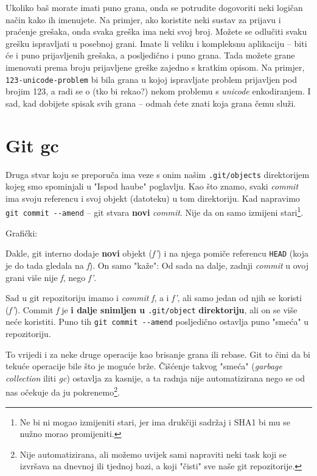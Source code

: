 Ukoliko baš morate imati puno grana, onda se potrudite dogovoriti neki logičan način kako ih imenujete.
Na primjer, ako koristite neki sustav za prijavu i praćenje grešaka, onda svaka greška ima neki svoj broj.
Možete se odlučiti svaku grešku ispravljati u posebnoj grani. 
Imate li veliku i kompleksnu aplikaciju -- biti će i puno prijavljenih grešaka, a posljedično i puno grana.
Tada možete grane imenovati prema broju prijavljene greške zajedno s kratkim opisom.
Na primjer, \verb+123-unicode-problem+ bi bila grana u kojoj ispravljate problem prijavljen pod brojim 123, a radi se o (tko bi rekao?) nekom problemu s \emph{unicode} enkodiranjem.
I sad, kad dobijete spisak svih grana -- odmah ćete znati koja grana čemu služi.

\section*{Git gc}

Druga stvar koju se preporuča ima veze s onim našim \verb+.git/objects+ direktorijem kojeg smo spominjali u "Ispod haube" poglavlju.
Kao što znamo, svaki \emph{commit} ima svoju referencu i svoj objekt (datoteku) u tom direktoriju.
Kad napravimo \verb+git commit --amend+ -- git stvara \textbf{novi} \emph{commit}.
Nije da on samo izmijeni stari\footnote{Ne bi ni mogao izmijeniti stari, jer ima drukčiji sadržaj i SHA1 bi mu se nužno morao promijeniti.}.

Grafički:



Dakle, git interno dodaje \textbf{novi} objekt (\emph{f'}) i na njega pomiče referencu \verb+HEAD+ (koja je do tada gledala na \emph f).
On samo "kaže": Od sada na dalje, zadnji \emph{commit} u ovoj grani više nije \emph f, nego \emph{f'}.

Sad u git repozitoriju imamo i \emph{commit} \emph f, a i \emph{f'}, ali samo jedan od njih se koristi (\emph{f'}).
Commit \emph f je \textbf{i dalje snimljen u} \verb+.git/object+ \textbf{direktoriju}, ali on se više neće koristiti.
Puno tih \verb+git commit --amend+ posljedično ostavlja puno "smeća" u repozitoriju.

To vrijedi i za neke druge operacije kao brisanje grana ili rebase.
Git to čini da bi tekuće operacije bile što je moguće brže.
Čišćenje takvog "smeća" (\emph{garbage collection} iliti \emph{gc}) ostavlja za kasnije, a ta radnja nije automatizirana nego se od nas očekuje da ju pokrenemo\footnote{Nije automatizirana, ali možemo uvijek sami napraviti neki task koji se izvršava na dnevnoj ili tjednoj bazi, a koji "čisti" sve naše git repozitorije.}.

